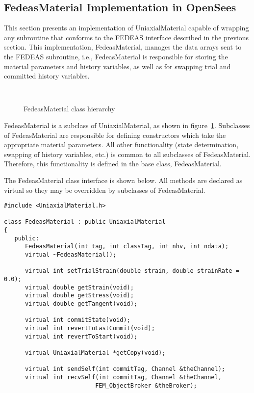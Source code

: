 \documentclass[12pt]{article}
\begin{document}
{\subsection{FedeasMaterial Implementation in OpenSees}
This section presents an implementation of UniaxialMaterial capable of wrapping any
subroutine that conforms to the FEDEAS interface described in the previous
section. This implementation, FedeasMaterial, manages the data arrays sent to the
FEDEAS subroutine, i.e., FedeasMaterial is responsible for storing the material
parameters and history variables, as well as for swapping trial and committed history
variables.

\begin{figure}[htpb]
\begin{center}
\leavevmode
\hbox{%
}
\end{center}
\caption{FedeasMaterial class hierarchy}
\label{fig:Fedeas}
\end{figure}

FedeasMaterial is a subclass of UniaxialMaterial, as shown in figure~\ref{fig:Fedeas}.
Subclasses of FedeasMaterial are responsible for defining constructors which take the
appropriate material parameters. All other functionality (state determination, swapping
of history variables, etc.) is common to all subclasses of FedeasMaterial. Therefore,
this functionality is defined in the base class, FedeasMaterial.

The FedeasMaterial class interface is shown below. All methods are declared as virtual
so they may be overridden by subclasses of FedeasMaterial.

{\sf\small
\begin{verbatim}
#include <UniaxialMaterial.h>

class FedeasMaterial : public UniaxialMaterial
{
   public:
      FedeasMaterial(int tag, int classTag, int nhv, int ndata);
      virtual ~FedeasMaterial();
     
      virtual int setTrialStrain(double strain, double strainRate = 0.0);
      virtual double getStrain(void);
      virtual double getStress(void);
      virtual double getTangent(void);
     
      virtual int commitState(void);
      virtual int revertToLastCommit(void);    
      virtual int revertToStart(void);        
     
      virtual UniaxialMaterial *getCopy(void);
     
      virtual int sendSelf(int commitTag, Channel &theChannel);  
      virtual int recvSelf(int commitTag, Channel &theChannel, 
                          FEM_ObjectBroker &theBroker);    
     

\end{verbatim}}}
\end{document}
